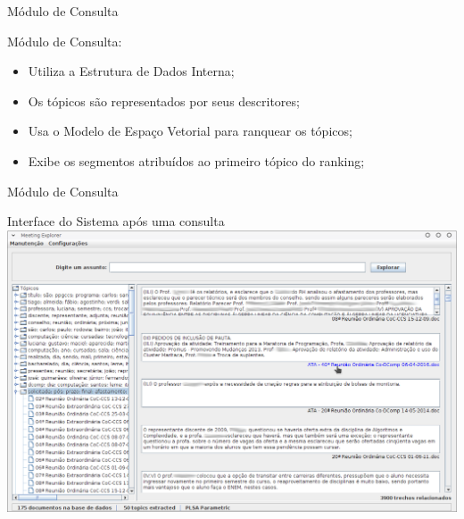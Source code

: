 \documentclass[xcolor=table]{beamer}
\begin{document}
\begin{frame}{Módulo de Consulta}

	\nblock{ } {
		Módulo de Consulta:
		\begin{itemize}
			\item Utiliza a Estrutura de Dados Interna;
			\item Os tópicos são representados por seus descritores;
			\item Usa o Modelo de Espaço Vetorial para ranquear os tópicos;
			\item Exibe os segmentos atribuídos ao primeiro tópico do ranking;
		\end{itemize}
	}








\end{frame}


\begin{frame}{Módulo de Consulta}

	\center Interface do Sistema após uma consulta\\
	\vspace{.5cm}
		\includegraphics[width=\textwidth]{images/tela-principal-2-1.png}


\end{frame}
\end{document}
